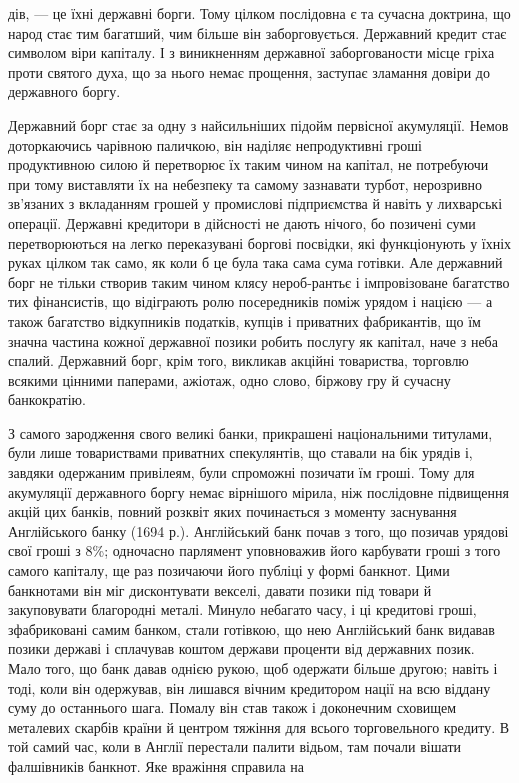 дів, — це їхні державні борги. Тому цілком послідовна є та сучасна доктрина, що народ стає тим
багатший, чим більше він заборговується. Державний кредит стає символом віри капіталу. І з
виникненням державної заборгованости місце гріха проти
святого духа, що за нього немає прощення, заступає зламання довіри до державного боргу.

Державний борг стає за одну з найсильніших підойм первісної акумуляції. Немов доторкаючись чарівною
паличкою, він наділяє непродуктивні гроші продуктивною силою й перетворює їх таким чином на капітал,
не потребуючи при тому виставляти
їх на небезпеку та самому зазнавати турбот, нерозривно зв’язаних з вкладанням грошей у промислові
підприємства й навіть у лихварські операції. Державні кредитори в дійсності не дають нічого, бо
позичені суми перетворюються на легко переказувані
боргові посвідки, які функціонують у їхніх руках цілком так само, як коли б це була така сама сума
готівки. Але державний борг не тільки створив таким чином клясу нероб-рантьє і імпровізоване
багатство тих фінансистів, що відіграють ролю посередників
поміж урядом і нацією — а також багатство відкупників податків, купців і приватних фабрикантів, що
їм значна частина кожної державної позики робить послугу як капітал, наче з неба спалий. Державний
борг, крім того, викликав акційні товариства,
торговлю всякими цінними паперами, ажіотаж, одно слово, біржову гру й сучасну банкократію.

З самого зародження свого великі банки, прикрашені національними титулами, були лише товариствами
приватних спекулянтів, що ставали на бік урядів і, завдяки одержаним привілеям, були спроможні
позичати їм гроші. Тому для акумуляції
державного боргу немає вірнішого мірила, ніж послідовне підвищення акцій цих банків, повний розквіт
яких починається з моменту заснування Англійського банку (1694 р.). Англійський банк почав з того,
що позичав урядові свої гроші з 8\%; одночасно
парлямент уповноважив його карбувати гроші з того самого капіталу, ще раз позичаючи його публіці у
формі банкнот. Цими банкнотами він міг дисконтувати векселі, давати позики під товари й закуповувати
благородні металі. Минуло небагато
часу, і ці кредитові гроші, зфабриковані самим банком, стали готівкою, що нею Англійський банк
видавав позики державі і сплачував коштом держави проценти від державних позик. Мало того, що банк
давав однією рукою, щоб одержати більше другою; навіть і тоді, коли він одержував, він лишався
вічним кредитором нації на всю віддану суму до останнього шага. Помалу він став також і доконечним
сховищем металевих скарбів країни й центром тяжіння для всього торговельного кредиту.
В той самий час, коли в Англії перестали палити відьом, там почали вішати фалшівників банкнот. Яке
вражіння справила на
